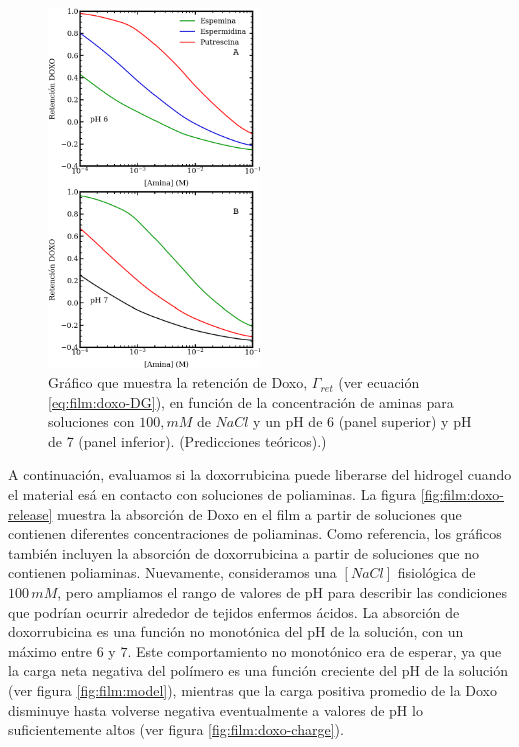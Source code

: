 \begin{figure}[!htb]
	\centering
	\includegraphics[width=0.5\textwidth]{Figures/graph-film/DG67.pdf}
	\caption{Gr\'afico que muestra la retenci\'on de Doxo, $\Gamma_{ret}$ (ver ecuaci\'on \ref{eq:film:doxo-DG}), en funci\'on de la concentraci\'on de aminas para soluciones con $100, mM$ de $NaCl$ y un pH de 6 (panel superior) y pH de 7 (panel inferior). (Predicciones te\'oricos).)}
	\label{fig:film:doxo-DG}
\end{figure}

A continuaci\'on, evaluamos si la doxorrubicina puede liberarse del hidrogel cuando el material es\'a en contacto con soluciones de poliaminas. La figura \ref{fig:film:doxo-release} muestra la absorci\'on de Doxo en el film a partir de soluciones que contienen diferentes concentraciones de poliaminas. Como referencia, los gr\'aficos tambi\'en incluyen la absorci\'on de doxorrubicina a partir de soluciones que no contienen poliaminas. Nuevamente, consideramos una $[NaCl]$ fisiol\'ogica de $100\, mM$, pero ampliamos el rango de valores de pH para describir las condiciones que podr\'ian ocurrir alrededor de tejidos enfermos \'acidos. La absorci\'on de doxorrubicina es una funci\'on no monot\'onica del pH de la soluci\'on, con un m\'aximo entre $6$ y $7$. Este comportamiento no monot\'onico  era de esperar, ya que la carga neta negativa del pol\'imero es una funci\'on creciente del pH de la soluci\'on (ver figura \ref{fig:film:model}), mientras que la carga positiva promedio de la Doxo disminuye hasta volverse negativa eventualmente a valores de pH lo suficientemente altos (ver figura  \ref{fig:film:doxo-charge}).



